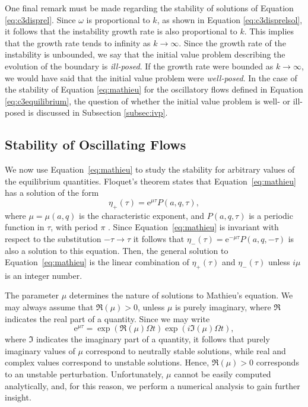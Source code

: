 \documentclass[12pt]{ociamthesis}
\begin{document}
One final remark must be made regarding the stability of solutions of Equation \eqref{eq:c3disprel}.
Since $\omega$ is proportional to $k$, as shown in Equation \eqref{eq:c3disprelsol}, it follows that the instability growth rate is also proportional to $k$.
This implies that the growth rate tends to infinity as $k \to \infty$.
Since the growth rate of the instability is unbounded, we say that the initial value problem describing the evolution of the boundary is \emph{ill-posed}.
If the growth rate were bounded as $k \to \infty$, we would have said that the initial value problem were \emph{well-posed}.
In the case of the stability of Equation \eqref{eq:mathieu} for the oscillatory flows defined in Equation \eqref{eq:c3equilibrium}, the question of whether the initial value problem is well- or ill-posed is discussed in Subsection \ref{subsec:ivp}.

\subsection{Stability of Oscillating Flows}
\label{subsec:oscillating}

We now use Equation~\eqref{eq:mathieu} to study the stability for arbitrary values of the equilibrium quantities.
Floquet's theorem states that Equation~\eqref{eq:mathieu} has a solution of the form
%
\[
\eta_+(\tau) = \mathrm{e}^{\mu \tau} P(a, q,\tau) ,
\]
%
where $\mu = \mu(a, q)$ is the characteristic exponent, and $P(a, q,\tau)$ is a periodic function in $\tau$, with period $\pi$ \citep[see, e.g.,][]{McLachlan1946, Abramowitz1965}.
Since Equation~\eqref{eq:mathieu} is invariant with respect to the substitution $-\tau \to \tau$ it follows that $\eta_-(\tau) = \mathrm{e}^{-\mu \tau} P(a, q,-\tau)$ is also a solution to this equation.
Then, the general solution to Equation~\eqref{eq:mathieu} is the linear combination of $\eta_+(\tau)$ and $\eta_-(\tau)$ unless $i\mu$ is an integer number.

The parameter $\mu$ determines the nature of solutions to Mathieu's equation. 
We may always assume that $\Re(\mu) > 0$, unless $\mu$ is purely imaginary, where $\Re$ indicates the real part of a quantity. Since we may write 
\[
\mathrm e^{\mu \tau} = \exp(\Re(\mu) \Omega t)\exp(i\Im(\mu) \Omega t),
\]
where $\Im$ indicates the imaginary part of a quantity, it follows that purely imaginary values of $\mu$ correspond to neutrally stable solutions, while real and complex values correspond to unstable solutions.
Hence, $\Re(\mu) > 0$ corresponds to an unstable perturbation.
Unfortunately, $\mu$ cannot be easily computed analytically, and, for this reason, we perform a numerical analysis to gain further insight.
\end{document}
